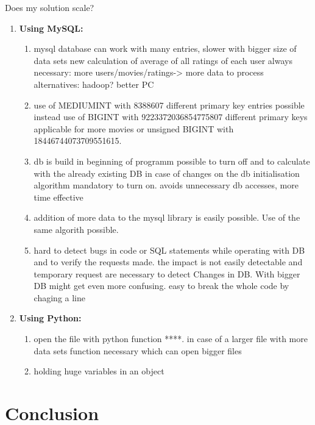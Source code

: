 \documentclass[a4paper,12pt,twoside]{article}
\begin{document}
Does my solution scale?
\begin{enumerate}
	\item \textbf{Using MySQL:} \\
	\begin{enumerate}
		\item 	
mysql database can work with many entries, slower with bigger size of data sets new calculation of average of all ratings of each user always necessary: more users/movies/ratings-> more data to process
alternatives: hadoop? better PC
		
\item use of MEDIUMINT with 	8388607 different primary key entries possible
instead use of BIGINT with 9223372036854775807 different primary keys applicable for more movies
or unsigned BIGINT with 18446744073709551615.
		
\item db is build in beginning of programm
possible to turn off and to calculate with the already existing DB
in case of changes on the db initialisation algorithm mandatory to turn on.
		avoids unnecessary db accesses, more time effective
		
		\item addition of more data to the mysql library is easily possible. Use of the same algorith possible.
		
		\item hard to detect bugs in code or SQL statements while operating with DB and to verify the requests made. the impact is not easily detectable and temporary request are necessary to detect Changes in DB. With bigger DB might get even more confusing.
		easy to break the whole code by chaging a line
	\end{enumerate}	
	
	
	\item \textbf{Using Python:} \\
	\begin{enumerate}
		\item 	open the file with python function ****. 
		in case of a larger file with more data sets function necessary which can open bigger files
	
		\item holding huge variables in an object 
	
	
	
	\end{enumerate}		

	
\end{enumerate}

\section{Conclusion}


 
\end{document}

